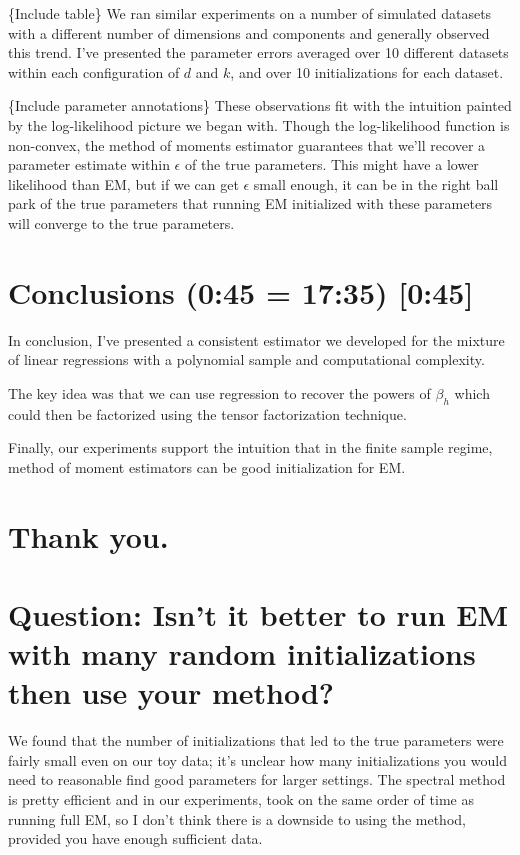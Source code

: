 \documentclass[tablecaption=bottom]{jmlr}
\begin{document}
\{Include table\} We ran similar experiments on a number of simulated
datasets with a different number of dimensions and components and
generally observed this trend. I've presented the parameter errors
averaged over 10 different datasets within each configuration of $d$ and
$k$, and over 10 initializations for each dataset.

\{Include parameter annotations\} These observations fit with the
intuition painted by the log-likelihood picture we began with. Though
the log-likelihood function is non-convex, the method of moments
estimator guarantees that we'll recover a parameter estimate within
$\epsilon$ of the true parameters. This might have a lower likelihood
than EM, but if we can get $\epsilon$ small enough, it can be in the
right ball park of the true parameters that running EM initialized with
these parameters will converge to the true parameters.

\section{Conclusions (0:45 = 17:35) {[}0:45{]}}

In conclusion, I've presented a consistent estimator we developed for
the mixture of linear regressions with a polynomial sample and
computational complexity.

The key idea was that we can use regression to recover the powers of
$\beta_h$ which could then be factorized using the tensor factorization
technique.

Finally, our experiments support the intuition that in the finite sample
regime, method of moment estimators can be good initialization for EM.

\section{Thank you.}

\section{Question: Isn't it better to run EM with many random
initializations then use your method?}

We found that the number of initializations that led to the true
parameters were fairly small even on our toy data; it's unclear how many
initializations you would need to reasonable find good parameters for
larger settings. The spectral method is pretty efficient and in our
experiments, took on the same order of time as running full EM, so I
don't think there is a downside to using the method, provided you have
enough sufficient data.
\end{document}
